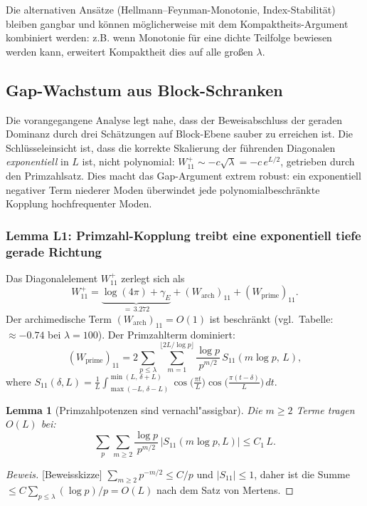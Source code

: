 ﻿\documentclass[12pt,a4paper]{article}
\newtheorem{lemma}[theorem]{Lemma}
\theoremstyle{definition}
\theoremstyle{remark}
\begin{document}
Die alternativen Ansätze (Hellmann--Feynman-Monotonie, Index-Stabilität) bleiben gangbar und können möglicherweise mit dem Kompaktheits-Argument kombiniert werden: z.B. wenn Monotonie für eine dichte Teilfolge bewiesen werden kann, erweitert Kompaktheit dies auf alle großen $\lambda$.

\subsection{Gap-Wachstum aus Block-Schranken}
\label{sec:gap-growth-block}

Die vorangegangene Analyse legt nahe, dass der Beweisabschluss der geraden Dominanz durch drei Schätzungen auf Block-Ebene sauber zu erreichen ist. Die Schlüsseleinsicht ist, dass die korrekte Skalierung der führenden Diagonalen \emph{exponentiell} in $L$ ist, nicht polynomial: $W_{11}^+ \sim -c\sqrt{\lambda} = -c\,e^{L/2}$, getrieben durch den Primzahlsatz. Dies macht das Gap-Argument extrem robust: ein exponentiell negativer Term niederer Moden überwindet jede polynomialbeschränkte Kopplung hochfrequenter Moden.

\subsubsection{Lemma L1: Primzahl-Kopplung treibt eine exponentiell tiefe gerade Richtung}

Das Diagonalelement $W_{11}^+$ zerlegt sich als
\begin{equation}
\label{eq:W11-decomp}
  W_{11}^+ = \underbrace{\log(4\pi) + \gamma_E}_{=\,3.272} + (W_{\mathrm{arch}})_{11} + (W_{\mathrm{prime}})_{11}.
\end{equation}
Der archimedische Term $(W_{\mathrm{arch}})_{11} = O(1)$ ist beschränkt (vgl.\ Tabelle: $\approx -0.74$ bei $\lambda = 100$). Der Primzahlterm dominiert:
\[
  (W_{\mathrm{prime}})_{11} = 2\sum_{p \leq \lambda}\sum_{m=1}^{\lfloor 2L/\log p\rfloor} \frac{\log p}{p^{m/2}}\,S_{11}(m\log p,\,L),
\]
where $S_{11}(\delta, L) = \frac{1}{L}\int_{\max(-L,\,\delta-L)}^{\min(L,\,\delta+L)} \cos\!\bigl(\frac{\pi t}{L}\bigr)\cos\!\bigl(\frac{\pi(t-\delta)}{L}\bigr)\,dt$.

\begin{lemma}[Primzahlpotenzen sind vernachl"assigbar]
\label{lem:m1-dominance}
Die $m \geq 2$ Terme tragen $O(L)$ bei:
\[
  \sum_p \sum_{m \geq 2} \frac{\log p}{p^{m/2}}\,|S_{11}(m\log p, L)| \leq C_1\,L.
\]
\end{lemma}
\begin{proof}[Beweis][Beweisskizze]
$\sum_{m \geq 2} p^{-m/2} \leq C/p$ und $|S_{11}| \leq 1$, daher ist die Summe $\leq C\sum_{p \leq \lambda} (\log p)/p = O(L)$ nach dem Satz von Mertens.
\end{proof}
\end{document}
